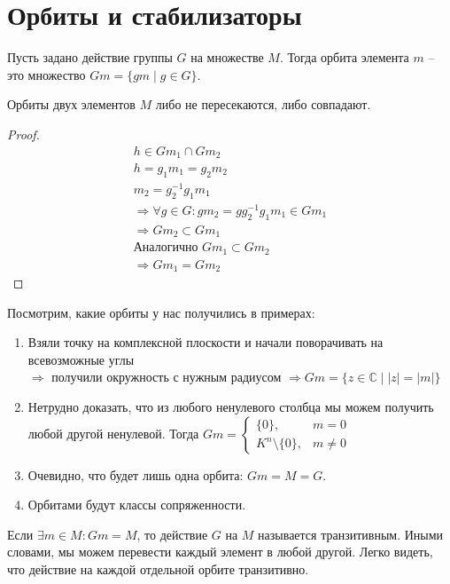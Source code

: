 \section{Орбиты и стабилизаторы}
\begin{conj}
    Пусть задано действие группы $G$ на множестве $M$.
    Тогда орбита элемента $m$ -- это множество $Gm = \{gm\; | \; g \in G\}$.
\end{conj}

\begin{theorem-non}
    Орбиты двух элементов $M$ либо не пересекаются, либо совпадают.
\end{theorem-non}
\begin{proof}
    \begin{gather*}
        h \in Gm_1 \cap Gm_2 \\
        h = g_1m_1 = g_2m_2 \\
        m_2 = g_2^{-1}g_1m_1  \\
        \Rightarrow \forall g \in G: gm_2 = gg_2^{-1}g_1m_1 \in Gm_1 \\
        \Rightarrow Gm_2 \subset Gm_1 \\
        \text{Аналогично } Gm_1 \subset Gm_2 \\
        \Rightarrow Gm_1 = Gm_2
    \end{gather*}
\end{proof}
Посмотрим, какие орбиты у нас получились в примерах:
\begin{enumerate}
    \item Взяли точку на комплексной плоскости и начали поворачивать на всевозможные углы \\ 
    $\Rightarrow$ получили окружность с нужным радиусом $\Rightarrow Gm = \{ z \in \mathbb{C} \; | \; |z| = |m| \}$
    \item Нетрудно доказать, что из любого ненулевого столбца мы можем получить любой другой ненулевой. 
    Тогда $Gm = \begin{cases}
        \{ 0 \}, & m = 0 \\
        K^n \setminus \{ 0 \}, & m \neq 0
    \end{cases} $
    \item Очевидно, что будет лишь одна орбита: $Gm = M = G$.
    \item Орбитами будут классы сопряженности.
\end{enumerate}

Если $\exists m \in M : Gm = M$, то действие $G$ на $M$ называется транзитивным. 
Иными словами, мы можем перевести каждый элемент в любой другой. 
Легко видеть, что действие на каждой отдельной орбите транзитивно.


